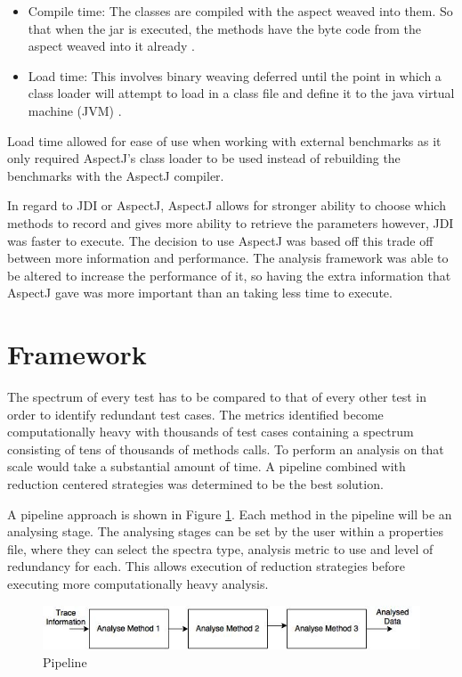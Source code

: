 \begin{itemize}
\item Compile time:
The classes are compiled with the aspect weaved into them. So that when the jar is executed, the methods have the byte code from the aspect weaved into it already \cite{weaving}.
\item Load time:
This involves binary weaving deferred until the point in which a class loader will attempt to load in a class file and define it to the java virtual machine (JVM) \cite{weaving}.
\end{itemize}

Load time allowed for ease of use when working with external benchmarks as it only required AspectJ's class loader to be used instead of rebuilding the benchmarks with the AspectJ compiler.

In regard to JDI or AspectJ, AspectJ allows for stronger ability to choose which methods to record and gives more ability to retrieve the parameters however, JDI was faster to execute. The decision to use AspectJ was based off this trade off between more information and performance. The analysis framework was able to be altered to increase the performance of it, so having the extra information that AspectJ gave was more important than an taking less time to execute.

\section{Framework}
\label{S:framework}

The spectrum of every test has to be compared to that of every other test in order to identify redundant test cases. The metrics identified become computationally heavy with thousands of test cases containing a spectrum consisting of tens of thousands of methods calls. To perform an analysis on that scale would take a substantial amount of time. A pipeline combined with reduction centered strategies was determined to be the best solution.

A pipeline approach is shown in Figure \ref{fig:pipeline}. Each method in the pipeline will be an analysing stage. The analysing stages can be set by the user within a properties file, where they can select the spectra type, analysis metric to use and level of redundancy for each. This allows execution of reduction strategies before executing more computationally heavy analysis.

\begin{figure}[h]
\includegraphics[width=\textwidth]{Pipeline.jpg}
\caption{Pipeline}
\label{fig:pipeline}
\end{figure}

